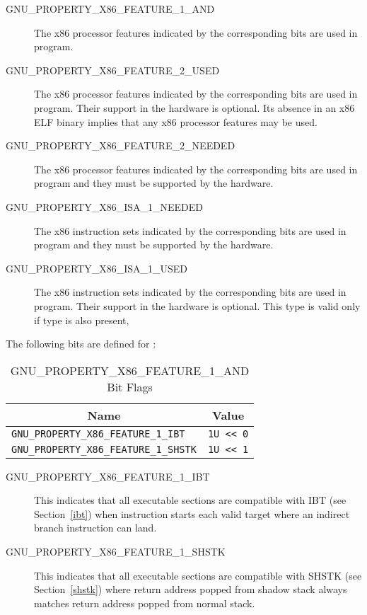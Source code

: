 \begin{description}
 \item[GNU_PROPERTY_X86_FEATURE_1_AND] The x86 processor features
   indicated by the corresponding bits are used in program.
 \item[GNU_PROPERTY_X86_FEATURE_2_USED] The x86 processor features
   indicated by the corresponding bits are used in program.  Their
   support in the hardware is optional.  Its absence in an x86 ELF
   binary implies that any x86 processor features may be used.
 \item[GNU_PROPERTY_X86_FEATURE_2_NEEDED] The x86 processor features
   indicated by the corresponding bits are used in program and they
   must be supported by the hardware.
 \item[GNU_PROPERTY_X86_ISA_1_NEEDED] The x86 instruction sets indicated
   by the corresponding bits are used in program and they must be
   supported by the hardware.
 \item[GNU_PROPERTY_X86_ISA_1_USED] The x86 instruction sets indicated
   by the corresponding bits are used in program.  Their support in the
   hardware is optional.  This type is valid only if
    type is also present,
\end{description}

The following bits are defined for :

\begin{table}[H]
\Hrule
  \caption{GNU_PROPERTY_X86_FEATURE_1_AND Bit Flags}
  \begin{center}
    \begin{tabular}[t]{l|l}
      \multicolumn{1}{c}{Name} & \multicolumn{1}{c}{Value} \\
      \hline
     \texttt{GNU_PROPERTY_X86_FEATURE_1_IBT} & \texttt{1U << 0} \\
     \texttt{GNU_PROPERTY_X86_FEATURE_1_SHSTK} & \texttt{1U << 1} \\
    \end{tabular}
  \end{center}
\Hrule
\end{table}

\begin{description}
 \item[GNU_PROPERTY_X86_FEATURE_1_IBT] This indicates that all executable
   sections are compatible with IBT (see Section~\ref{ibt}) when
    instruction starts each valid target where an indirect
   branch instruction can land.
 \item[GNU_PROPERTY_X86_FEATURE_1_SHSTK] This indicates that all
   executable sections are compatible with SHSTK (see Section~\ref{shstk})
   where return address popped from shadow stack always matches return
   address popped from normal stack.
\end{description}

